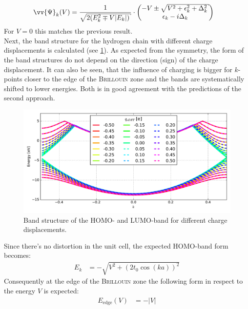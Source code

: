 \begin{align}
\vv{\Psi}_k(V) &= \frac{1}{\sqrt{2\left(E_k^2\mp V|E_k|\right)}}\cdot \begin{pmatrix*}[c]
-V\pm \sqrt{V^2+\epsilon_k^2+\Delta_k^2}\\
\epsilon_k - i \Delta_k
\end{pmatrix*}
\end{align}
For $V=0$ this matches the previous result.\\
Next, the band structure for the hydrogen chain with different charge displacements is calculated (see \cref{image_hydrogen_charged_bands}). As expected from the symmetry, the form of the band structures do not depend on the direction (sign) of the charge displacement. It can also be seen, that the influence of charging is bigger for $k$-points closer to the edge of the \textsc{Brillouin} zone and the bands are systematically shifted to lower energies. Both is in good agreement with the predictions of the second approach.
\begin{figure}
	\centering
	\includegraphics[width = 13cm]{Images/Hydrogen/charging/band_structure_q_1}
	\caption{Band structure of the HOMO- and LUMO-band for different charge displacements.}
	\label{image_hydrogen_charged_bands}
\end{figure}
Since there's no distortion in the unit cell, the expected HOMO-band form becomes:
\begin{align}
E_k &= -\sqrt{V^2 + \left(2t_0\cos(ka)\right)^2}
\end{align}
Consequently at the edge of the \textsc{Brillouin} zone the following form in respect to the energy $V$ is expected:
\begin{align}
E_\text{edge}(V) &= -\left|V\right|
\end{align}
